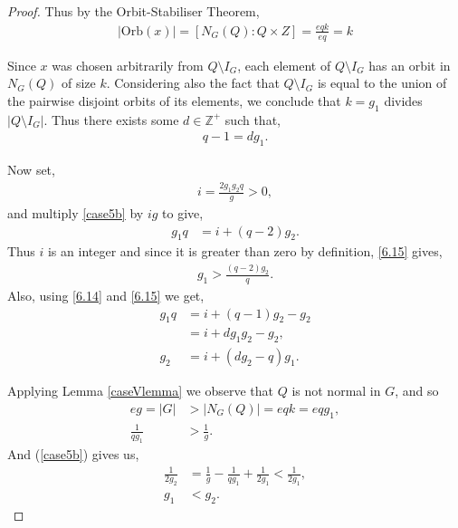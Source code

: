 \begin{proof}
Thus by the Orbit-Stabiliser Theorem,
\begin{align*} |\text{Orb}(x)| = [N_G(Q) : Q \times Z] = \frac{eqk}{eq} = k
\end{align*}

Since $x$ was chosen arbitrarily from $Q \! \setminus \! I_G$, each element of $Q \! \setminus \! I_G$ has an orbit in $N_G(Q)$ of size $k$. Considering also the fact that $Q \! \setminus \! I_G$ is equal to the union of the pairwise disjoint orbits of its elements, we conclude that $k = g_1$ divides $|Q \! \setminus \! I_G|$. Thus there exists some $d \in \mathbb{Z^+}$ such that,
\begin{align}\label{6.14} q-1 = d g_1.
\end{align}

Now set,
\begin{align} \label{6.14a} i = \frac{2 g_1 g_2 q}{g} > 0,
\end{align}
and multiply \eqref{case5b} by $ig$ to give,
\begin{align}\label{6.15} g_1 q &= i + (q-2) g_2.
\end{align}
Thus $i$ is an integer and since it is greater than zero by definition, \eqref{6.15} gives,
\begin{align}\label{6.16b} g_1 > \frac{(q-2) g_2}{q}.
\end{align}
Also, using \eqref{6.14} and \eqref{6.15} we get,
\begin{align}\label{6.16a} g_1 q &= i + (q-1) g_2 - g_2 \nonumber
\\ &= i + d g_1 g_2 - g_2, \nonumber
\\ g_2 &= i + (d g_2 - q) g_1.
\end{align}

Applying Lemma \ref{caseVlemma} we observe that $Q$ is not normal in $G$, and so 
\begin{align*} eg = |G| &> |N_G(Q)| = eqk = eqg_1, \\[1.5ex]
\frac{1}{qg_1} &> \frac{1}{g}.
\end{align*}
And (\ref{case5b}) gives us,
\begin{align}\label{6.13}  \frac{1}{2g_2} &= \frac{1}{g} - \frac{1}{qg_1} + \frac{1}{2g_1} < \frac{1}{2g_1}, \nonumber
\\[1.5ex] g_1 &< g_2.
\end{align}


\end{proof}
